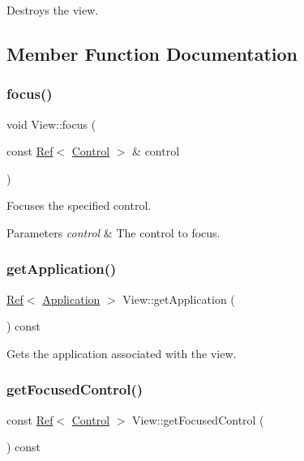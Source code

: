Destroys the view. 



\subsection{Member Function Documentation}
\mbox{\label{class_view_a5a029fe19172989524b1ad6e02695374}} 
\subsubsection{\texorpdfstring{focus()}{focus()}}
{\footnotesize\ttfamily void View\+::focus (\begin{DoxyParamCaption}\item[{const \mbox{\hyperlink{class_ref}{Ref}}$<$ \mbox{\hyperlink{class_control}{Control}} $>$ \&}]{control }\end{DoxyParamCaption})}



Focuses the specified control. 


\begin{DoxyParams}{Parameters}
{\em control} & The control to focus.\\
\hline
\end{DoxyParams}
\mbox{\label{class_view_ad902fbd5ece1dd9e02e05ce473f90712}} 
\subsubsection{\texorpdfstring{getApplication()}{getApplication()}}
{\footnotesize\ttfamily \mbox{\hyperlink{class_ref}{Ref}}$<$ \mbox{\hyperlink{class_application}{Application}} $>$ View\+::get\+Application (\begin{DoxyParamCaption}{ }\end{DoxyParamCaption}) const}



Gets the application associated with the view. 

\mbox{\label{class_view_ab5987bd0e07a48ff5f9033c6db76bc1f}} 
\subsubsection{\texorpdfstring{getFocusedControl()}{getFocusedControl()}}
{\footnotesize\ttfamily const \mbox{\hyperlink{class_ref}{Ref}}$<$ \mbox{\hyperlink{class_control}{Control}} $>$ View\+::get\+Focused\+Control (\begin{DoxyParamCaption}{ }\end{DoxyParamCaption}) const}



